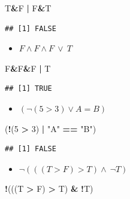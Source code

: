 \documentclass[12pt,a4paper]{article}
\newenvironment{Shaded}{\begin{snugshade}}{\end{snugshade}}
\newcommand{\DecValTok}[1]{\textcolor[rgb]{0.00,0.00,0.81}{#1}}
\newcommand{\NormalTok}[1]{#1}
\newcommand{\SpecialCharTok}[1]{\textcolor[rgb]{0.81,0.36,0.00}{\textbf{#1}}}
\newcommand{\StringTok}[1]{\textcolor[rgb]{0.31,0.60,0.02}{#1}}
\begin{document}
\begin{Shaded}
\begin{Highlighting}[]
\NormalTok{    T}\SpecialCharTok{\&}\NormalTok{F }\SpecialCharTok{|}\NormalTok{ F}\SpecialCharTok{\&}\NormalTok{T}
\end{Highlighting}
\end{Shaded}

\begin{verbatim}
## [1] FALSE
\end{verbatim}

\begin{itemize}
  \item $F \land F \land F\ \lor \ T$
\end{itemize}

\begin{Shaded}
\begin{Highlighting}[]
\NormalTok{    F}\SpecialCharTok{\&}\NormalTok{F}\SpecialCharTok{\&}\NormalTok{F }\SpecialCharTok{|}\NormalTok{ T}
\end{Highlighting}
\end{Shaded}

\begin{verbatim}
## [1] TRUE
\end{verbatim}

\begin{itemize}
  \item $(\neg (5 > 3) \lor A = B)$
\end{itemize}

\begin{Shaded}
\begin{Highlighting}[]
\NormalTok{    (}\SpecialCharTok{!}\NormalTok{(}\DecValTok{5} \SpecialCharTok{\textgreater{}} \DecValTok{3}\NormalTok{) }\SpecialCharTok{|} \StringTok{"A"} \SpecialCharTok{==} \StringTok{"B"}\NormalTok{) }
\end{Highlighting}
\end{Shaded}

\begin{verbatim}
## [1] FALSE
\end{verbatim}

\begin{itemize}
  \item $\neg(((T > F) > T) \land \ \neg T)$
\end{itemize}

\begin{Shaded}
\begin{Highlighting}[]
    \SpecialCharTok{!}\NormalTok{(((T }\SpecialCharTok{\textgreater{}}\NormalTok{ F) }\SpecialCharTok{\textgreater{}}\NormalTok{ T) }\SpecialCharTok{\&} \SpecialCharTok{!}\NormalTok{T)}
\end{Highlighting}
\end{Shaded}
\end{document}
